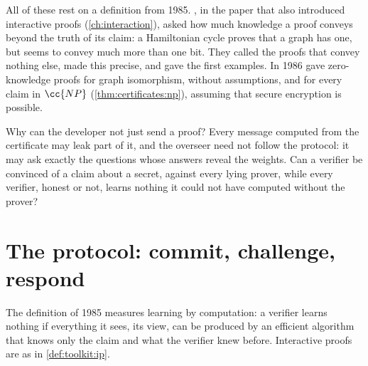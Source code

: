 \begin{refsection}
All of these rest on a definition from 1985. \Textcite{GoldwasserMicaliRackoff1989}, in the paper that also introduced interactive proofs (\cref{ch:interaction}), asked how much knowledge a proof conveys beyond the truth of its claim: a Hamiltonian cycle proves that a graph has one, but seems to convey much more than one bit. They called  the proofs that convey nothing else, made this precise, and gave the first examples. In 1986 \textcite{GoldreichMicaliWigderson1991} gave zero-knowledge proofs for graph isomorphism, without assumptions, and for every claim in $\cc{NP}$ (\cref{thm:certificates:np}), assuming that secure encryption is possible.

Why can the developer not just send a proof? Every message computed from the certificate may leak part of it, and the overseer need not follow the protocol: it may ask exactly the questions whose answers reveal the weights. Can a verifier be convinced of a claim about a secret, against every lying prover, while every verifier, honest or not, learns nothing it could not have computed without the prover?

\section{The protocol: commit, challenge, respond}\label{sec:zeroknowledge:protocol}

The definition of 1985 measures learning by computation: a verifier learns nothing if everything it sees, its view, can be produced by an efficient algorithm that knows only the claim and what the verifier knew before. Interactive proofs are as in \cref{def:toolkit:ip}.


\end{refsection}
